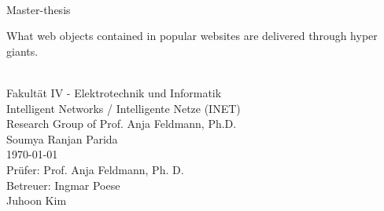 \documentclass[a4paper,11pt,abstracton,twoside,titlepage,openany,nochapterprefix,noappendixprefix,liststotoc,bibtotoc,normalheadings,pointlessnumbers,BCOR1cm]{article}
\begin{document}
\begin{titlepage}
\thispagestyle{fancy}

\chead{}
\lfoot{}
\cfoot{}
\rfoot{}



\begin{Large}
\vspace{5em}
\center
	\mbox{}\\
	\vspace{5em}
	Master-thesis
	\vspace{3em}

	\begin{Huge}
	What web objects contained in popular websites are delivered through hyper giants.
	\end{Huge}
	
	\mbox{}\\
	\vspace{5em}
	Fakultät IV - Elektrotechnik und Informatik\\
	Intelligent Networks / Intelligente Netze (INET)\\
	Research Group of Prof. Anja Feldmann, Ph.D.\\
	\vspace{3em}
	Soumya Ranjan Parida\\
	\today\\

	\vspace{4 em}
	Prüfer: Prof. Anja Feldmann, Ph. D.\\
	\vspace{-.5 ex}
	Betreuer: Ingmar Poese\\
	Juhoon Kim\\
\end{Large}
\end{titlepage}
\pagestyle{empty}

\end{document}
